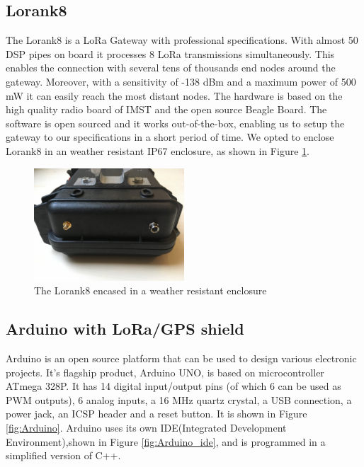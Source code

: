 \subsection{Lorank8}
The Lorank8\cite{lorank8} is a LoRa Gateway with professional specifications. With almost 50 DSP pipes on board it processes 8 LoRa transmissions simultaneously. This enables the connection with several tens of thousands end nodes around the gateway. Moreover, with a sensitivity of -138 dBm and a maximum power of 500 mW it can easily reach the most distant nodes. The hardware is based on the high quality radio board of IMST and the open source Beagle Board\cite{beaglebone}.  The software is open sourced and it works out-of-the-box, enabling us to setup the gateway to our specifications in a short period of time. We opted to enclose Lorank8 in an weather resistant IP67 enclosure, as shown in Figure \ref{fig:Lorank8}.

\begin{figure}[h]
    \centering
    \includegraphics[width=0.5\textwidth]{images/lorank8.jpg}
    \caption{The Lorank8 encased in a weather resistant enclosure \cite{lorank8}}
    \label{fig:Lorank8}
\end{figure}


\subsection{Arduino with LoRa/GPS shield}

Arduino\cite{arduino} is an open source platform that can be used to design various electronic projects. It’s flagship product, Arduino UNO, is based on microcontroller ATmega 328P. It has 14 digital input/output pins (of which 6 can be used as PWM outputs), 6 analog inputs, a 16 MHz quartz crystal, a USB connection, a power jack, an ICSP header and a reset button. It is shown in Figure \ref{fig:Arduino}. Arduino uses its own IDE(Integrated Development Environment),shown in Figure \ref{fig:Arduino_ide}, and is programmed in a simplified version of C++.


